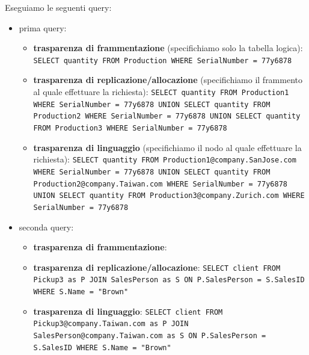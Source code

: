 \begin{esempio} 
      Eseguiamo le seguenti query:
      \begin{itemize}
            \item prima query:
            \begin{itemize}
                  \item \textbf{trasparenza di frammentazione} (specifichiamo solo la tabella logica): \texttt{SELECT quantity FROM Production WHERE SerialNumber = 77y6878}
                  \item \textbf{trasparenza di replicazione/allocazione} (specifichiamo il frammento al quale effettuare la richiesta): \texttt{SELECT quantity FROM Production1 WHERE SerialNumber = 77y6878 UNION SELECT quantity FROM Production2 WHERE SerialNumber = 77y6878 UNION SELECT quantity FROM Production3 WHERE SerialNumber = 77y6878  }
                  \item \textbf{trasparenza di linguaggio} (specifichiamo il nodo al quale effettuare la richiesta): \texttt{SELECT quantity FROM Production1@company.SanJose.com WHERE SerialNumber = 77y6878 UNION SELECT quantity FROM Production2@company.Taiwan.com WHERE SerialNumber = 77y6878 UNION SELECT quantity FROM Production3@company.Zurich.com WHERE SerialNumber = 77y6878  }
            \end{itemize}
            \item seconda query:
            \begin{itemize}
                  \item \textbf{trasparenza di frammentazione}: 
                  \item \textbf{trasparenza di replicazione/allocazione}: \texttt{SELECT client FROM Pickup3 as P JOIN SalesPerson as S ON P.SalesPerson = S.SalesID WHERE S.Name = "Brown"}
                  \item \textbf{trasparenza di linguaggio}: \texttt{SELECT client FROM Pickup3@company.Taiwan.com as P JOIN SalesPerson@company.Taiwan.com as S ON P.SalesPerson = S.SalesID WHERE S.Name = "Brown"}
            \end{itemize}
      \end{itemize}
\end{esempio}
